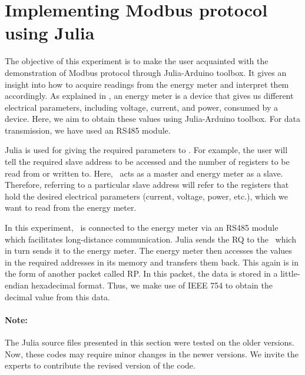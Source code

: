 
\section{Implementing Modbus protocol using Julia}
The objective of this experiment is to make the user acquainted with
the demonstration of Modbus protocol through Julia-Arduino toolbox.
It gives an insight into how to acquire readings from the energy meter and interpret them accordingly. As explained in ,
an energy meter is a device that gives us different electrical parameters, including voltage, current, and power, consumed by a device.
Here, we aim to obtain these values using Julia-Arduino toolbox. For data transmission, we have used an RS485 module.

Julia is used for giving the required parameters to \arduino. For
example, the user will tell the required slave address to be accessed
and the number of registers to be read from or written to. Here,
\arduino\ acts as a master and energy meter as a slave. Therefore,
referring to a particular slave address will refer to the registers
that hold the desired electrical parameters (current, voltage, power, etc.), which we want to read from the energy meter.

In this experiment, \arduino\ is connected to the energy meter via an RS485 module which facilitates long-distance communication.
Julia sends the RQ to the \arduino\, which in turn sends it to the
energy meter. The energy meter then accesses the values in the
required addresses in its memory and transfers them back. This again
is in the form of another packet called RP. In this packet, the data is stored in a little-endian hexadecimal format. Thus, we make use of IEEE 754 to obtain the decimal value from this data.

\paragraph{Note: } The Julia source files presented in this section were tested on the older versions. Now, these codes may require minor changes in
the newer versions. We invite the experts to contribute the revised version of the code.




